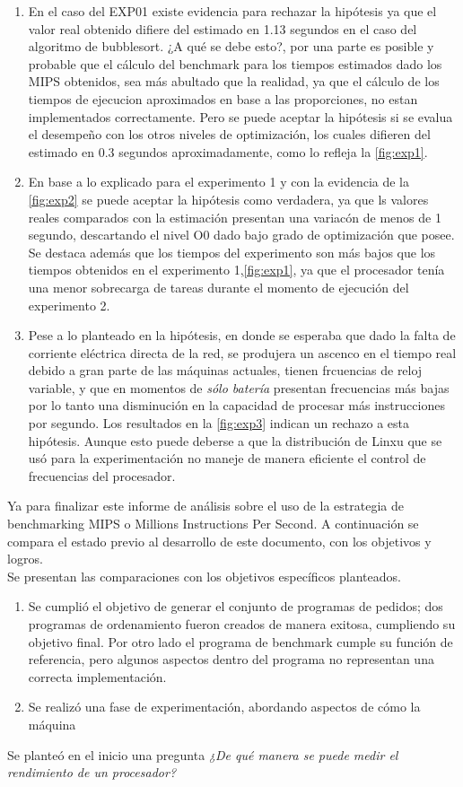 \documentclass{memoria}
\begin{document}
\begin{enumerate}
\item En el caso del EXP01 existe evidencia para rechazar la hipótesis ya que el valor real obtenido difiere del estimado en 1.13 segundos en el caso del algoritmo de bubblesort. ¿A qué se debe esto?, por una parte es posible y probable que el cálculo del benchmark para los tiempos estimados dado los MIPS obtenidos, sea más abultado que la realidad, ya que el cálculo de los tiempos de ejecucion aproximados en base a las proporciones, no estan implementados correctamente. Pero se puede aceptar la hipótesis si se evalua el desempeño con los otros niveles de optimización, los cuales difieren del estimado en 0.3 segundos aproximadamente, como lo refleja la \ref{fig:exp1}.
\item En base a lo explicado para el experimento 1 y con la evidencia de la \ref{fig:exp2} se puede aceptar la hipótesis como verdadera, ya que ls valores reales comparados con la estimación presentan una variacón de menos de 1 segundo, descartando el nivel O0 dado bajo grado de optimización que posee.
Se destaca además que los tiempos del experimento son más bajos que los tiempos obtenidos en el experimento 1,\ref{fig:exp1}, ya que el procesador tenía una menor sobrecarga de tareas durante el momento de ejecución del experimento 2.
\item Pese a lo planteado en la hipótesis, en donde se esperaba que dado la falta de corriente eléctrica directa de la red, se produjera un ascenco en el tiempo real debido a gran parte de las máquinas actuales, tienen frcuencias de reloj variable, y que en momentos de \emph{sólo batería} presentan frecuencias más bajas por lo tanto una disminución en la capacidad de procesar más instrucciones por segundo. Los resultados en la \ref{fig:exp3} indican un rechazo a esta hipótesis. Aunque esto puede deberse a que la distribución de Linxu que se usó para la experimentación no maneje de manera eficiente el control de frecuencias del procesador.
\end{enumerate}

Ya para finalizar este informe de análisis sobre el uso de la estrategia de benchmarking MIPS o Millions Instructions Per Second. A continuación se compara el estado previo al desarrollo de este documento, con los objetivos y logros.
\\Se presentan las comparaciones con los objetivos específicos planteados.
\begin{enumerate}
\item Se cumplió el objetivo de generar el conjunto de programas de pedidos; dos programas de ordenamiento fueron creados de manera exitosa, cumpliendo su objetivo final. Por otro lado el programa de benchmark cumple su función de referencia, pero algunos aspectos dentro del programa no representan una correcta implementación.
\item Se realizó una fase de experimentación, abordando aspectos de cómo la máquina
\end{enumerate}
Se planteó en el inicio una pregunta \emph{¿De qué manera se puede medir el rendimiento de un procesador?}


\bibliografiasincita
\end{document}
